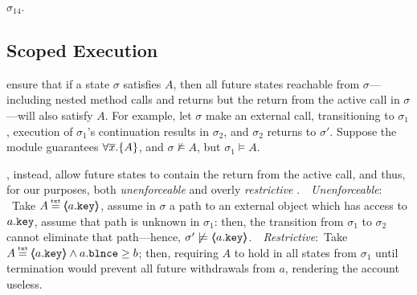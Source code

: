  $\sigma_{14}$.

 
 \subsection{Scoped Execution}
 \label{sect:bounded}

  ensure that if a state $\sigma$ satisfies $A$, then all future states reachable from $\sigma$—including nested method calls and returns but   the return from the active call in $\sigma$—will also satisfy $A$. For example, let $\sigma$ make an external call, transitioning to $\sigma_1$,    execution of $\sigma_1$'s continuation results in $\sigma_2$, and $\sigma_2$ returns  to $\sigma'$. 
Suppose the module guarantees $\forall {\overline{x}}.{{\{}}{A}{{\}}}$, and $\sigma \not\models A$, but $\sigma_1 \models A$. 
 
%
 \cite{liskov94behavioral,usinghistory,Cohen10}, instead, allow future states to contain the return from the active call, and thus,   for our purposes,  both
 \emph{unenforceable} and overly \emph{restrictive} .\ \  \emph{Unenforceable}: \ Take $A \txteq \inside{a.\prg{key}}$,  assume  in $\sigma$ a path to an external object which has access to $a.\mbox{\normalfont{\texttt{key}}}$, assume that path is unknown in $\sigma_1$: then, the transition from $\sigma_1$ to $\sigma_2$ cannot eliminate that path—hence, $\sigma' \not\models \langle\!\!\langle a.\mbox{\normalfont{\texttt{key}}} \rangle\!\!\rangle$.\ \  \emph{Restrictive}:\ Take $A \txteq \inside{a.\prg{key}}\wedge a.\prg{blnce}\geq b$; then,  requiring  $A$   to hold in all states from $\sigma_1$ until termination would prevent all future withdrawals from $a$, rendering the account useless.

